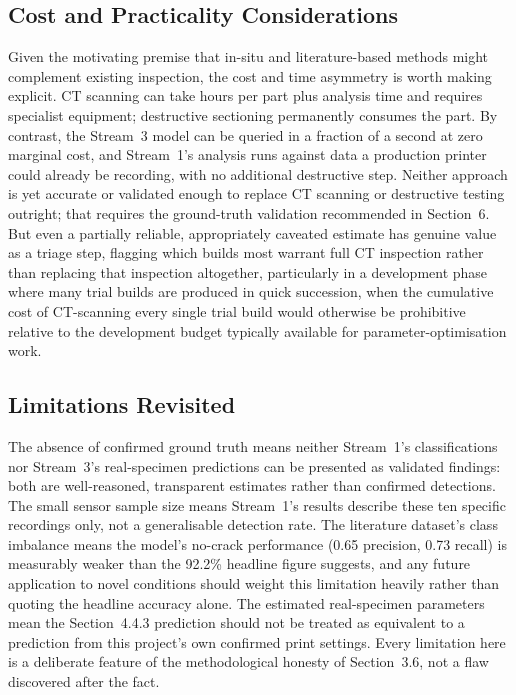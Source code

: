\documentclass[a4paper]{article}
\begin{document}
\subsection{Cost and Practicality Considerations}
Given the motivating premise that in-situ and literature-based methods might complement existing inspection, the cost and time asymmetry is worth making explicit. CT scanning can take hours per part plus analysis time and requires specialist equipment; destructive sectioning permanently consumes the part. By contrast, the Stream~3 model can be queried in a fraction of a second at zero marginal cost, and Stream~1's analysis runs against data a production printer could already be recording, with no additional destructive step. Neither approach is yet accurate or validated enough to replace CT scanning or destructive testing outright; that requires the ground-truth validation recommended in Section~6. But even a partially reliable, appropriately caveated estimate has genuine value as a triage step, flagging which builds most warrant full CT inspection rather than replacing that inspection altogether, particularly in a development phase where many trial builds are produced in quick succession, when the cumulative cost of CT-scanning every single trial build would otherwise be prohibitive relative to the development budget typically available for parameter-optimisation work.

\subsection{Limitations Revisited}
The absence of confirmed ground truth means neither Stream~1's classifications nor Stream~3's real-specimen predictions can be presented as validated findings: both are well-reasoned, transparent estimates rather than confirmed detections. The small sensor sample size means Stream~1's results describe these ten specific recordings only, not a generalisable detection rate. The literature dataset's class imbalance means the model's no-crack performance (0.65 precision, 0.73 recall) is measurably weaker than the 92.2\% headline figure suggests, and any future application to novel conditions should weight this limitation heavily rather than quoting the headline accuracy alone. The estimated real-specimen parameters mean the Section~4.4.3 prediction should not be treated as equivalent to a prediction from this project's own confirmed print settings. Every limitation here is a deliberate feature of the methodological honesty of Section~3.6, not a flaw discovered after the fact.
\end{document}
